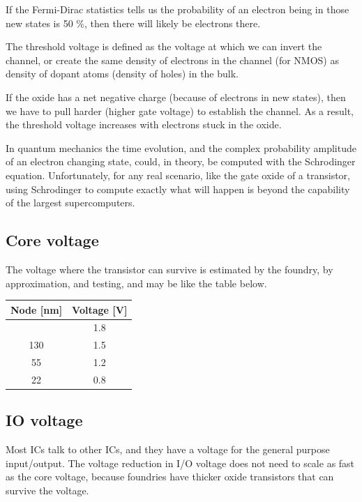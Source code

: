 If the Fermi-Dirac statistics tells us the probability of an electron
being in those new states is 50 \%, then there will likely be electrons
there.

The threshold voltage is defined as the voltage at which we can invert
the channel, or create the same density of electrons in the channel (for
NMOS) as density of dopant atoms (density of holes) in the bulk.

If the oxide has a net negative charge (because of electrons in new
states), then we have to pull harder (higher gate voltage) to establish
the channel. As a result, the threshold voltage increases with electrons
stuck in the oxide.

In quantum mechanics the time evolution, and the complex probability
amplitude of an electron changing state, could, in theory, be computed
with the Schrodinger equation. Unfortunately, for any real scenario,
like the gate oxide of a transistor, using Schrodinger to compute
exactly what will happen is beyond the capability of the largest
supercomputers.

\subsection{Core voltage}\label{core-voltage}

The voltage where the transistor can survive is estimated by the
foundry, by approximation, and testing, and may be like the table below.

\begin{longtable}[]{@{}cc@{}}
\toprule\noalign{}
Node {[}nm{]} & Voltage {[}V{]} \\
\midrule\noalign{}
\endhead
\bottomrule\noalign{}
\endlastfoot
180 & 1.8 \\
130 & 1.5 \\
55 & 1.2 \\
22 & 0.8 \\
\end{longtable}

\subsection{IO voltage}\label{io-voltage}

Most ICs talk to other ICs, and they have a voltage for the general
purpose input/output. The voltage reduction in I/O voltage does not need
to scale as fast as the core voltage, because foundries have thicker
oxide transistors that can survive the voltage.


